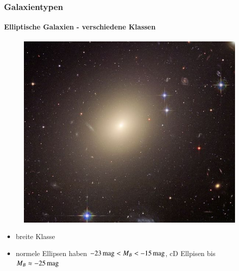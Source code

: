\begin{frame}
\frametitle{Galaxientypen}
\framesubtitle{Elliptische Galaxien - verschiedene Klassen}

\begin{figure}
\includegraphics[scale=0.2]{Abell_Ellipise.jpg}
\end{figure}

\begin{itemize}
\item breite Klasse
\item normele Ellipsen haben $\unit[-23]{mag} < M_B < \unit[-15]{mag}$, cD Ellpisen bis $M_B \approx \unit[-25]{mag}$
\end{itemize}

\end{frame}


